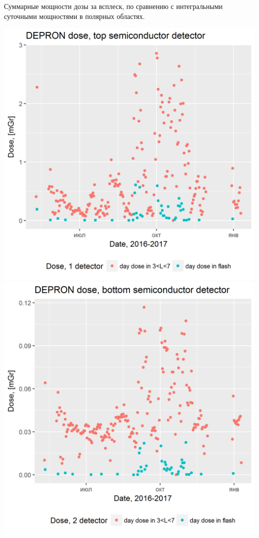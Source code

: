 \documentclass[t, aspectratio=43]{beamer}
\begin{document}
\begin{frame}	
\frametitle{\insertsection} 
{\tiny Суммарные мощности дозы за всплеск, по сравнению с интегральными суточными мощностями в полярных областях. }


\begin{center}
	\includegraphics[width=0.5\linewidth]{images/ressumdosepolarflash1lin}
	\includegraphics[width=0.5\linewidth]{images/ressumdosepolarflash2lin}
\end{center}


\end{frame}
\end{document}
